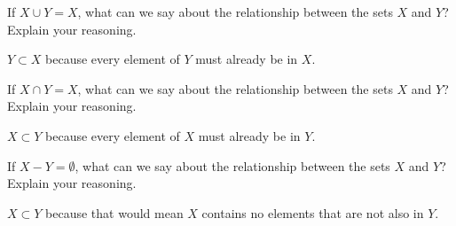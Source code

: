 \documentclass{ximera}
\begin{document}
\begin{problem}
If $X\cup Y = X$, what can we say about the relationship between the sets $X$ and $Y$? Explain your reasoning.
\begin{freeResponse}
$Y\subset X$ because every element of $Y$ must already be in $X$.  
\end{freeResponse}
\end{problem}

\begin{problem}
If $X\cap Y = X$, what can we say about the relationship between the sets $X$ and $Y$? Explain your reasoning.
\begin{freeResponse}
$X\subset Y$ because every element of $X$ must already be in $Y$.  
\end{freeResponse}
\end{problem}

\begin{problem}
If $X-Y =\emptyset$, what can we say about the relationship between the sets $X$ and $Y$? Explain your reasoning.
\begin{freeResponse}
$X\subset Y$ because that would mean $X$ contains no elements that are not also in $Y$.  
\end{freeResponse}
\end{problem}
\end{document}
